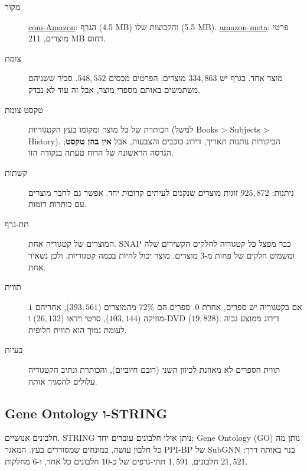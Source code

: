 \documentclass[11pt]{article}
\newcommand{\en}[1]{\foreignlanguage{english}{#1}}
\begin{document}
\begin{description}
\item[מקור] \href{https://snap.stanford.edu/data/com-Amazon.html}{\en{com-Amazon}}: הגרף
(\en{4.5 MB}) והקבוצות שלו (\en{5.5 MB}).
\href{https://snap.stanford.edu/data/amazon-meta.html}{\en{amazon-meta}}: פרטי מוצרים,
\en{211 MB} דחוס.
\item[צומת] מוצר אחד. בגרף יש $334{,}863$ מוצרים; הפרטים מכסים $548{,}552$. סביר ששניהם משתמשים
באותם מספרי מוצר, אבל זה עוד לא נבדק.
\item[טקסט צומת] הכותרת של כל מוצר ומקומו בעץ הקטגוריות (למשל
\en{Books > Subjects > History}). הביקורות נותנות תאריך, דירוג כוכבים והצבעות, אבל \textbf{אין
בהן טקסט}; הגרסה הראשונה של הדוח טעתה בנקודה הזו.
\item[קשתות] ניתנות: $925{,}872$ זוגות מוצרים שנקנים לעיתים קרובות יחד. אפשר גם לחבר מוצרים עם
כותרות דומות.
\item[תת-גרף] המוצרים של קטגוריה אחת. \en{SNAP} כבר מפצל כל קטגוריה לחלקים הקשירים שלה ומשמיט
חלקים של פחות מ-$3$ מוצרים. מוצר יכול להיות בכמה קטגוריות, ולכן נשאיר אחת.
\item[תווית] $1$ אם בקטגוריה יש ספרים, אחרת $0$. ספרים הם $72\%$ מהמוצרים ($393{,}561$), אחריהם
מוזיקה ($103{,}144$), סרטי וידאו ($26{,}132$) ו-\en{DVD} ($19{,}828$). דירוג ממוצע גבוה לעומת
נמוך הוא תווית חלופית.
\item[בעיות] תווית הספרים לא מאוזנת לכיוון השני (רובם חיוביים), והכותרת ונתיב הקטגוריה עלולים
להסגיר אותה.
\end{description}

\subsection*{\en{Gene Ontology} ו-\en{STRING}}

חלבונים אנושיים. \en{STRING} נותן אילו חלבונים עובדים יחד; \en{Gene Ontology} (\en{GO}) נותן מה
כל חלבון עושה, כמונחים שמסודרים בעץ. המאגר \en{PPI-BP} של \en{SubGNN} בנוי באותה דרך:
$21{,}521$ חלבונים, $1{,}591$ תתי-גרפים של כ-$10$ חלבונים כל אחד, ו-$6$ מחלקות.
\end{document}
